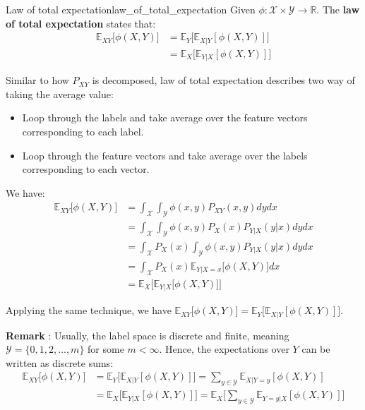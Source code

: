 \begin{proposition}{Law of total expectation}{law_of_total_expectation}
    Given $\phi:\mathcal{X} \times \mathcal{Y} \to \mathbb{R}$. The \textbf{law of total expectation}
    states that:
    \begin{align*}
        \mathbb{E}_{XY}\Big[ \phi(X, Y) \Big] 
            &= \mathbb{E}_Y\Big[ \mathbb{E}_{X|Y}[\phi(X, Y)] \Big] \\
            &= \mathbb{E}_X\Big[ \mathbb{E}_{Y|X}[\phi(X, Y)] \Big]
    \end{align*}

    \noindent Similar to how $P_{XY}$ is decomposed, law of total expectation describes two way of taking the
    average value:
    \begin{itemize}
        \item Loop through the labels and take average over the feature vectors corresponding to each label.
        \item Loop through the feature vectors and take average over the labels corresponding to each vector.
    \end{itemize}
\end{proposition}

\begin{proof*}
    We have:
    \begin{align*}
        \mathbb{E}_{XY}\Big[ \phi(X, Y) \Big]
            &= \int_{\mathcal{X}}\int_{\mathcal{Y}} \phi(x, y) P_{XY}(x, y) dy dx \\
            &= \int_{\mathcal{X}}\int_{\mathcal{Y}} \phi(x, y) P_X(x)P_{Y|X}(y|x) dy dx \\
            &= \int_{\mathcal{X}} P_X(x) \int_{\mathcal{Y}} \phi(x, y) P_{Y|X}(y|x)dy dx \\
            &= \int_{\mathcal{X}} P_X(x) \mathbb{E}_{Y|X=x}\Big[ \phi(X, Y) \Big] dx \\
            &= \mathbb{E}_X\Big[ \mathbb{E}_{Y|X}\Big[ \phi(X, Y) \Big] \Big]
    \end{align*}

    \noindent Applying the same technique, we have $\mathbb{E}_{XY}\Big[ \phi(X, Y) \Big] = \mathbb{E}_{Y}\Big[ \mathbb{E}_{X|Y}[\phi(X, Y)] \Big]$.
\end{proof*}

\noindent\textbf{Remark} : Usually, the label space is discrete and finite, meaning $\mathcal{Y} = \{ 0, 1, 2, \dots, m \}$
for some $m < \infty$. Hence, the expectations over $Y$ can be written as discrete sums:
\begin{align*}
    \mathbb{E}_{XY}\Big[ \phi(X, Y) \Big]
    &= \mathbb{E}_Y\Big[ \mathbb{E}_{X|Y}[\phi(X, Y)] \Big] = \sum_{y\in\mathcal{Y}} \mathbb{E}_{X|Y=y}[\phi(X, Y)]
    \\
    &= \mathbb{E}_X\Big[ \mathbb{E}_{Y|X}[\phi(X, Y)] \Big] = \mathbb{E}_X\Bigg[ \sum_{y\in\mathcal{Y}} \mathbb{E}_{Y=y|X}[\phi(X, Y)] \Bigg]
\end{align*}


